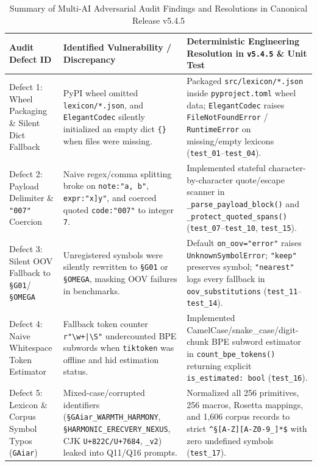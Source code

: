 \documentclass[9pt,a4paper]{extarticle}
\begin{document}
\begin{table}[h!]
\centering
\caption{Summary of Multi-AI Adversarial Audit Findings and Resolutions in Canonical Release v5.4.5}
\label{tab:adversarial_audit}
\scriptsize
\renewcommand{\arraystretch}{0.88}
\setlength{\tabcolsep}{2.5pt}
\begin{tabularx}{\textwidth}{L{2.8cm} L{4.4cm} Y}
\toprule
{}
\textbf{\color{white}Audit Defect ID} &
\textbf{\color{white}Identified Vulnerability / Discrepancy} &
\textbf{\color{white}Deterministic Engineering Resolution in \texttt{v5.4.5} \& Unit Test} \\
\midrule
Defect 1: Wheel Packaging \& Silent Dict Fallback & PyPI wheel omitted \texttt{lexicon/*.json}, and \texttt{ElegantCodec} silently initialized an empty dict \texttt{\{\}} when files were missing. & Packaged \texttt{src/lexicon/*.json} inside \texttt{pyproject.toml} wheel data; \texttt{ElegantCodec} raises \texttt{FileNotFoundError} / \texttt{RuntimeError} on missing/empty lexicons (\texttt{test\_01}--\texttt{test\_04}). \\
Defect 2: Payload Delimiter \& \texttt{"007"} Coercion & Naive regex/comma splitting broke on \texttt{note:"a, b"}, \texttt{expr:"x]y"}, and coerced quoted \texttt{code:"007"} to integer \texttt{7}. & Implemented stateful character-by-character quote/escape scanner in \texttt{\_parse\_\allowbreak payload\_\allowbreak block()} and \texttt{\_protect\_\allowbreak quoted\_\allowbreak spans()} (\texttt{test\_07}--\texttt{test\_10}, \texttt{test\_15}). \\
Defect 3: Silent OOV Fallback to \texttt{\S G01}/\texttt{\S OMEGA} & Unregistered symbols were silently rewritten to \texttt{\S G01} or \texttt{\S OMEGA}, masking OOV failures in benchmarks. & Default \texttt{on\_oov="error"} raises \texttt{UnknownSymbolError}; \texttt{"keep"} preserves symbol; \texttt{"nearest"} logs every fallback in \texttt{oov\_substitutions} (\texttt{test\_11}--\texttt{test\_14}). \\
Defect 4: Naive Whitespace Token Estimator & Fallback token counter \texttt{r"\textbackslash w+|\textbackslash S"} undercounted BPE subwords when \texttt{tiktoken} was offline and hid estimation status. & Implemented CamelCase/snake\_case/digit-chunk BPE subword estimator in \texttt{count\_bpe\_tokens()} returning explicit \texttt{is\_estimated: bool} (\texttt{test\_16}). \\
Defect 5: Lexicon \& Corpus Symbol Typos (\texttt{GAiar}) & Mixed-case/corrupted identifiers (\texttt{\S GAiar\_\allowbreak WARMTH\_\allowbreak HARMONY}, \texttt{\S HARMONIC\_\allowbreak ERECVERY\_\allowbreak NEXUS}, CJK \texttt{U+822C/U+7684}, \texttt{\_v2}) leaked into Q11/Q16 prompts. & Normalized all 256 primitives, 256 macros, Rosetta mappings, and 1,606 corpus records to strict \texttt{\^{}\S[A-Z][A-Z0-9\_]*\$} with zero undefined symbols (\texttt{test\_17}). \\

\end{tabularx}
\end{table}
\end{document}
